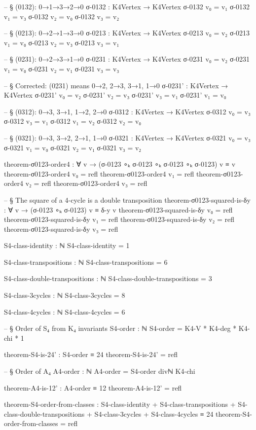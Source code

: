 \documentclass[11pt,a4paper]{book}
\begin{document}
\begin{code}
-- § (0132): 0→1→3→2→0
σ-0132 : K4Vertex → K4Vertex
σ-0132 v₀ = v₁
σ-0132 v₁ = v₃
σ-0132 v₂ = v₀
σ-0132 v₃ = v₂

-- § (0213): 0→2→1→3→0
σ-0213 : K4Vertex → K4Vertex
σ-0213 v₀ = v₂
σ-0213 v₁ = v₀
σ-0213 v₂ = v₃
σ-0213 v₃ = v₁

-- § (0231): 0→2→3→1→0
σ-0231 : K4Vertex → K4Vertex
σ-0231 v₀ = v₂
σ-0231 v₁ = v₀
σ-0231 v₂ = v₁
σ-0231 v₃ = v₃

-- § Corrected: (0231) means 0→2, 2→3, 3→1, 1→0
σ-0231' : K4Vertex → K4Vertex
σ-0231' v₀ = v₂
σ-0231' v₂ = v₃
σ-0231' v₃ = v₁
σ-0231' v₁ = v₀

-- § (0312): 0→3, 3→1, 1→2, 2→0
σ-0312 : K4Vertex → K4Vertex
σ-0312 v₀ = v₃
σ-0312 v₃ = v₁
σ-0312 v₁ = v₂
σ-0312 v₂ = v₀

-- § (0321): 0→3, 3→2, 2→1, 1→0
σ-0321 : K4Vertex → K4Vertex
σ-0321 v₀ = v₃
σ-0321 v₁ = v₀
σ-0321 v₂ = v₁
σ-0321 v₃ = v₂

theorem-σ0123-order4 : ∀ v → (σ-0123 ∘ₖ σ-0123 ∘ₖ σ-0123 ∘ₖ σ-0123) v ≡ v
theorem-σ0123-order4 v₀ = refl
theorem-σ0123-order4 v₁ = refl
theorem-σ0123-order4 v₂ = refl
theorem-σ0123-order4 v₃ = refl

-- § The square of a 4-cycle is a double transposition
theorem-σ0123-squared-is-δy : ∀ v → (σ-0123 ∘ₖ σ-0123) v ≡ δ-y v
theorem-σ0123-squared-is-δy v₀ = refl
theorem-σ0123-squared-is-δy v₁ = refl
theorem-σ0123-squared-is-δy v₂ = refl
theorem-σ0123-squared-is-δy v₃ = refl

S4-class-identity : ℕ
S4-class-identity = 1

S4-class-transpositions : ℕ
S4-class-transpositions = 6

S4-class-double-transpositions : ℕ
S4-class-double-transpositions = 3

S4-class-3cycles : ℕ
S4-class-3cycles = 8

S4-class-4cycles : ℕ
S4-class-4cycles = 6

-- § Order of S₄ from K₄ invariants
S4-order : ℕ
S4-order = K4-V * K4-deg * K4-chi * 1

theorem-S4-is-24' : S4-order ≡ 24
theorem-S4-is-24' = refl

-- § Order of A₄
A4-order : ℕ
A4-order = S4-order divℕ K4-chi

theorem-A4-is-12' : A4-order ≡ 12
theorem-A4-is-12' = refl

theorem-S4-order-from-classes : S4-class-identity 
                              + S4-class-transpositions 
                              + S4-class-double-transpositions 
                              + S4-class-3cycles 
                              + S4-class-4cycles ≡ 24
theorem-S4-order-from-classes = refl


\end{code}
\end{document}
